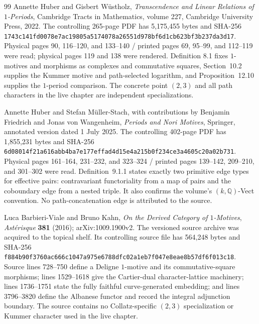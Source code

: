 \begin{thebibliography}{99}
Annette Huber and Gisbert W\"ustholz,
\emph{Transcendence and Linear Relations of $1$-Periods},
Cambridge Tracts in Mathematics, volume 227, Cambridge University Press,
2022.
The controlling 265-page PDF has 5,175,455 bytes and SHA-256
\nolinkurl{1743c141fd0078e7ac19805a5174078a26551d978bf6d1cb623bf3b237da3d17}.
Physical pages 90, 116--120, and 133--140 / printed pages 69, 95--99, and
112--119 were read; physical pages 119 and 138 were rendered.  Definition
8.1 fixes $1$-motives and morphisms as complexes and commutative squares,
Section~10.2 supplies the Kummer motive and path-selected logarithm, and
Proposition~12.10 supplies the $1$-period comparison.  The concrete point
$(2,3)$ and all path characters in the live chapter are independent
specializations.

Annette Huber and Stefan M\"uller-Stach, with contributions by Benjamin
Friedrich and Jonas von Wangenheim,
\emph{Periods and Nori Motives}, Springer, annotated version dated
1 July 2025.
The controlling 402-page PDF has 1,855,231 bytes and SHA-256
\nolinkurl{6d08014f21a616abb4ba7e177effad4d15e4a215b0f234ce3a4605c20a02b731}.
Physical pages 161--164, 231--232, and 323--324 / printed pages 139--142,
209--210, and 301--302 were read.  Definition~9.1.1 states exactly two
primitive edge types for effective pairs: contravariant functoriality from a
map of pairs and the coboundary edge from a nested triple.  It also confirms
the volume's $(k,\mathbb Q)$-Vect convention.  No path-concatenation edge is
attributed to the source.

Luca Barbieri-Viale and Bruno Kahn,
\emph{On the Derived Category of $1$-Motives},
\emph{Ast\'erisque} \textbf{381} (2016); arXiv:1009.1900v2.
The versioned source archive was acquired to the topical shelf.  Its
controlling source file  has 564,248 bytes and
SHA-256
\nolinkurl{f884b90f3760ac666c1047a975e6788dfc02a1eb7f047e8eae8b57df6f013c18}.
Source lines 728--750 define a Deligne $1$-motive and its commutative-square
morphisms; lines 1529--1618 give the Cartier-dual character-lattice
machinery; lines 1736--1751 state the fully faithful curve-generated
embedding; and lines 3796--3820 define the Albanese functor and record the
integral adjunction boundary.  The source contains no Collatz-specific
$(2,3)$ specialization or Kummer character used in the live chapter.


\end{thebibliography}
